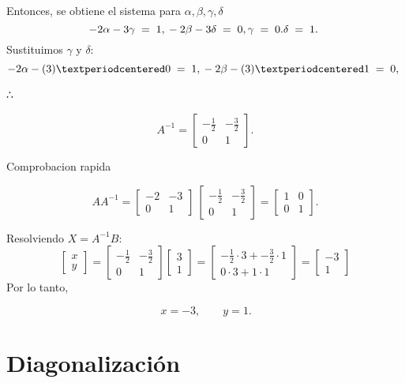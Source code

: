\documentclass[
  letterpaper,
  DIV=11,
  numbers=noendperiod]{scrreprt}
\begin{document}
Entonces, se obtiene el sistema para
\({\alpha}, {\beta}, {\gamma},{\delta}\) \[
-2{\alpha}-3{\gamma} \;=\; 1,\\
-2{\beta}-3{\delta} \;=\; 0,\\
{\gamma} \;=\; 0.\\
{\delta} \;=\; 1.\
\] Sustituimos \({\gamma}\) y \({\delta}\): \[
-2{\alpha}-(3) · 0\;=\; 1,\\
-2{\beta}-(3) · 1\;=\; 0,\
\]

∴

\[
A^{-1}=\begin{bmatrix}-\tfrac{1}{2} & -\tfrac{3}{2}\\[2pt] 0 & 1\end{bmatrix}.
\]

Comprobacion rapida

\[
A A^{-1}=\begin{bmatrix}-2 & -3\\[2pt] 0 & 1\end{bmatrix} \
\begin{bmatrix}-\tfrac{1}{2} & -\tfrac{3}{2}\\[2pt] 0 & 1\end{bmatrix} =
\begin{bmatrix}1 & 0\\[2pt] 0 & 1\end{bmatrix}.
\]

Resolviendo \(X=A^{-1}B\): \[
\begin{bmatrix}x\\[2pt] y\end{bmatrix}=
\begin{bmatrix}-\tfrac{1}{2} & -\tfrac{3}{2}\\[2pt] 0 & 1\end{bmatrix}\begin{bmatrix}3\\[2pt] 1\end{bmatrix}
= \begin{bmatrix}-\tfrac{1}{2}· 3+-\tfrac{3}{2}· 1\\[2pt] 0· 3+1· 1\end{bmatrix}=\begin{bmatrix}-3\\[2pt] 1\end{bmatrix}
\] Por lo tanto,

\[
\boxed{\,x=-3,\qquad y=1}.
\]

\section{Diagonalización}\label{diagonalizaciuxf3n}
\end{document}
